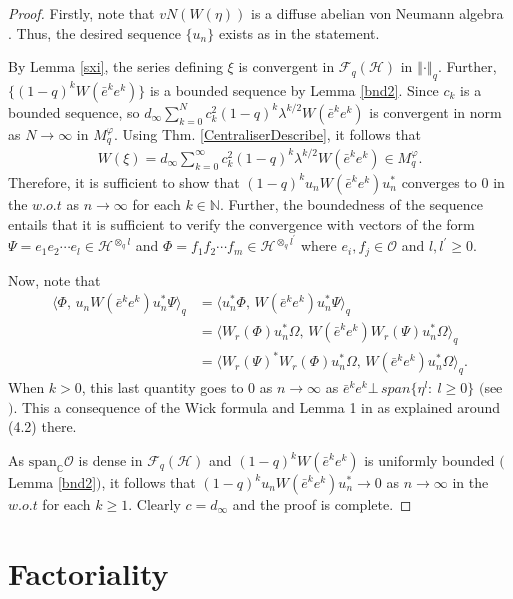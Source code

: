 \documentclass[12pt, a4paper,reqno]{amsart}
\theoremstyle{definition}
\renewcommand{\geq}{\geqslant}
\def\C{\mathbb C}
\def\N{\mathbb N}
\newcommand{\CH}{\mathcal{H}}
\newcommand{\norm}[1]{\left\Vert#1\right\Vert}
\begin{document}
\begin{proof}
Firstly, note that $vN(W(\eta))$ is a diffuse abelian von Neumann algebra \cite[\S4]{bik-kunal}. Thus, the desired sequence $\{u_n\}$ exists as in the statement. 

By Lemma \ref{sxi}, the series defining $\xi$ is convergent in $\mathcal{F}_q(\CH)$ in $\norm{\cdot}_q$. 
Further, $\{ (1-q)^k W(\bar{e}^k e^k )\}$ is a bounded sequence by Lemma \ref{bnd2}. Since $c_k$ is a bounded sequence, so $d_\infty\sum_{k=0}^N c_k^2(1-q)^k\lambda^{k/2} W(\bar{e}^k e^k)$ is convergent in norm as $N\rightarrow\infty$ in $M_q^\varphi$. Using Thm. \ref{CentraliserDescribe}, it follows that 
\begin{align*}
W(\xi) = d_\infty \sum_{k=0}^\infty c_k^2(1-q)^k\lambda^{k/2} W(\bar{e}^k e^k )\in M_q^\varphi.
\end{align*}
Therefore, it is sufficient to show that $(1-q)^ku_n W(\bar{e}^k e^k ) u_n^*$ converges to $0$ in the $w.o.t$ as $ n\rightarrow \infty$ for each $k \in\N$. Further, the boundedness of the sequence entails that it is sufficient to verify 
the convergence with vectors of the form $\Psi = e_1 e_2\cdots e_l\in \CH^{\otimes_q l}$ and $\Phi = f_1 f_2\cdots f_m\in \CH^{\otimes_q l^\prime}$ where $e_i, f_j \in \mathcal{O}$ and $l,l^\prime\geq 0$.

 Now, note that 
\begin{align*}
\langle  \Phi,\, u_n W(\bar{e}^k e^k ) u_n^* \Psi \rangle_q&=\langle u_n^* \Phi,\,W(\bar{e}^k e^k ) u_n^* \Psi  \rangle_q\\
&=\langle W_r(\Phi)u_n^* \Omega,\,W(\bar{e}^k e^k ) W_r(\Psi) u_n^* \Omega \rangle_q\\&=\langle W_r(\Psi)^*W_r(\Phi)u_n^* \Omega,\,W(\bar{e}^k e^k ) u_n^* \Omega \rangle_q.
\end{align*}
When $k>0$, this last quantity goes to 0 as $n\to \infty$ as
$\bar{e}^k e^k \bot \,span \{\eta^l:\ l\geq0\}$ $($see \cite[\S4]{bik-kunal}$)$. This a consequence of
the Wick formula and Lemma 1 in \cite{SW} as explained around (4.2)
there.


As $\text{span}_\C\mathcal{O}$ is dense in $\mathcal{F}_q(\CH)$  and $(1-q)^{k}W({\bar e}^k e^k)$ is uniformly bounded $($Lemma \ref{bnd2}$)$, it follows that $(1-q)^ku_n W(\bar{e}^k e^k ) u_n^*\rightarrow 0$ as $n\rightarrow \infty$ in the $w.o.t$ for each $k\geq 1$. Clearly $c=d_\infty$ and the proof is complete. 
\end{proof}


\section{Factoriality}\label{Secfactor}
\end{document}
